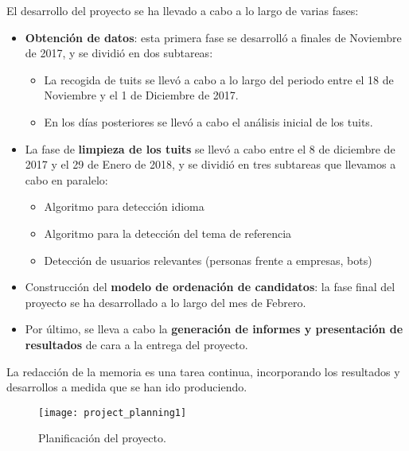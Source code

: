El desarrollo del proyecto se ha llevado a cabo a lo largo de varias fases:
\begin{itemize}
\item {\bf Obtención de datos}: esta primera fase se desarrolló a finales de Noviembre
de 2017, y se dividió en dos subtareas:
	\begin{itemize}
	\item La recogida de tuits se llevó a cabo a lo largo del periodo entre el 18 de Noviembre
y el 1 de Diciembre de 2017.
	\item En los días posteriores se llevó a cabo el análisis inicial de los tuits.
	\end{itemize}
\item La fase de {\bf limpieza de los tuits} se llevó a cabo entre el 8 de diciembre de 2017 y el 29 de Enero
de 2018, y se dividió en tres subtareas que llevamos a cabo en paralelo:
	\begin{itemize}
	\item Algoritmo para detección idioma
	\item Algoritmo para la detección del tema de referencia 
	\item Detección de usuarios relevantes (personas frente a empresas, bots)
	\end{itemize}
\item Construcción del {\bf modelo de ordenación de candidatos}: la fase final del proyecto se ha desarrollado a lo largo del mes de Febrero.
\item Por último, se lleva a cabo la {\bf generación de informes y presentación de resultados} de cara a la entrega del proyecto.
\end{itemize}
La redacción de la memoria	es una tarea continua, incorporando los 
resultados y desarrollos a medida que se han ido produciendo.

\begin{sidewaysfigure}
\texttt{[image: project\_planning1]}
\caption{Planificación del proyecto.}
\label{fig:planificacion_proyecto}
\end{sidewaysfigure}

